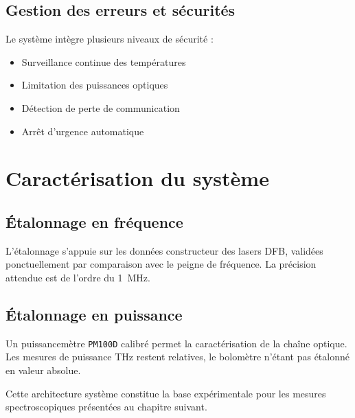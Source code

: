 \subsection{Gestion des erreurs et sécurités}

Le système intègre plusieurs niveaux de sécurité :
\begin{itemize}
    \item Surveillance continue des températures
    \item Limitation des puissances optiques
    \item Détection de perte de communication
    \item Arrêt d'urgence automatique
\end{itemize}

\section{Caractérisation du système}

\subsection{Étalonnage en fréquence}

L'étalonnage s'appuie sur les données constructeur des lasers DFB, validées ponctuellement par comparaison avec le peigne de fréquence. La précision attendue est de l'ordre du \SI{1}{\MHz}.

\subsection{Étalonnage en puissance}

Un puissancemètre \texttt{PM100D} calibré permet la caractérisation de la chaîne optique. Les mesures de puissance THz restent relatives, le bolomètre n'étant pas étalonné en valeur absolue.

Cette architecture système constitue la base expérimentale pour les mesures spectroscopiques présentées au chapitre suivant.